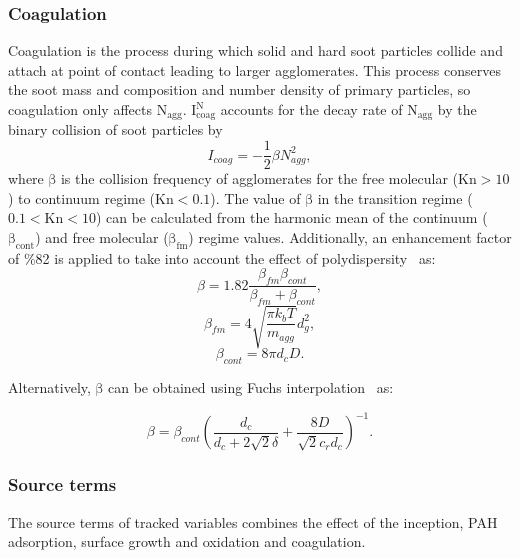 \subsubsection{Coagulation}
\label{sec:monocoag}
Coagulation is the process during which solid and hard soot particles collide and attach at point of contact leading to larger agglomerates. This process conserves the soot mass and composition and number density of primary particles, so coagulation only affects $\mathrm{N_{agg}}$. $\mathrm{I^N_{coag}}$ accounts for the decay rate of $\mathrm{N_{agg}}$ by the binary collision of soot particles by
\begin{equation}
	I_{coag} = -\frac{1}{2}\beta N^2_{agg}
	\label{eqn:Icoag},
\end{equation}
where $\mathrm{\beta}$ is the collision frequency of agglomerates for the free molecular ($\mathrm{Kn>10}$) to continuum regime ($\mathrm{Kn<0.1}$). The value of $\mathrm{\beta}$ in the transition regime ($\mathrm{0.1<Kn<10}$) can be calculated from the harmonic mean of the continuum ($\mathrm{\beta_{cont}}$) and free molecular ($\mathrm{\beta_{fm}}$) regime values. Additionally, an enhancement factor of \%82 is applied to take into account the effect of polydispersity~\citep{kelesidis2021self} as:
\begin{equation}
	\beta = 1.82\frac{\beta_{fm}\beta_{cont}}{\beta_{fm}+\beta_{cont}}
	\label{eqn:betahmmono},
\end{equation}
\begin{equation}
	\beta_{fm} = 4\sqrt{\frac{\pi k_b T}{m_{agg}}} d^2_g
	\label{eqn:betafmmono},
\end{equation}
\begin{equation}
	\beta_{cont} = 8\pi d_c D
	\label{eqn:betacontmono}.
\end{equation}

Alternatively, $\mathrm{\beta}$ can be obtained using Fuchs interpolation~\citep{fuchs1965mechanics} as:

\begin{equation}
	\beta = \beta_{cont}
	\left(
		\frac{d_c}{d_c+2\sqrt{2}\delta} +
		\frac{8D}{\sqrt{2}c_r d_c}
	\right)^{-1}
	\label{eqn:betafuchsmono}.
\end{equation}

\subsubsection{Source terms}
The source terms of tracked variables combines the effect of the inception, PAH adsorption, surface growth and oxidation and coagulation.

